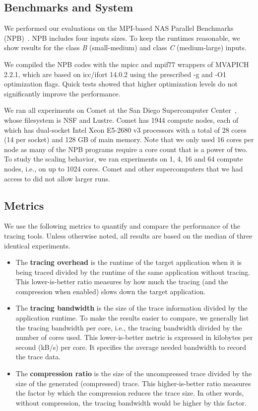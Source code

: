 \subsection{Benchmarks and System}

We performed our evaluations on the MPI-based NAS Parallel Benchmarks (NPB)~\cite{nas}.
%
NPB includes four inputs sizes.
%
To keep the runtimes reasonable, we show results for the class \textit{B} (small-medium) and class \textit{C} (medium-large) inputs.
%

We compiled the NPB codes with the mpicc and mpif77 wrappers of MVAPICH 2.2.1, which are based on icc/ifort 14.0.2 using the prescribed -g and -O1 optimization flags.
%
Quick tests showed that higher optimization levels do not significantly improve the performance.
%

We ran all experiments on Comet at the San Diego Supercomputer Center~\cite{comet}, whose filesystem is NSF and Lustre.
%
Comet has 1944 compute nodes, each of which has dual-socket Intel Xeon E5-2680 v3 processors with a total of 28 cores (14 per socket) and 128 GB of main memory.
%
Note that we only used 16 cores per node as many of the NPB programs require a core count that is a power of two.
%
To study the scaling behavior, we ran experiments on 1, 4, 16 and 64 compute nodes, i.e., on up to 1024 cores. Comet and other supercomputers that we had access to did not allow larger runs.

\subsection{Metrics}

We use the following metrics to quantify and compare the performance of the tracing tools.
%
Unless otherwise noted, all results are based on the median of three identical experiments.
%
\begin{itemize}
\item The \textbf{tracing overhead} is the runtime of the target application when it is being traced divided by the runtime of the same application without tracing.
%
This lower-is-better ratio measures by how much the tracing (and the compression when enabled) slows down the target application.
%
\item The \textbf{tracing bandwidth} is the size of the trace information divided by the application runtime.
%
To make the results easier to compare, we generally list the tracing bandwidth per core, i.e., the tracing bandwidth divided by the number of cores used.
%
This lower-is-better metric is expressed in kilobytes per second (kB/s) per core.
%
It specifies the average needed bandwidth to record the trace data.
%
\item The \textbf{compression ratio} is the size of the uncompressed trace divided by the size of the generated (compressed) trace.
%
This higher-is-better ratio measures the factor by which the compression reduces the trace size.
%
In other words, without compression, the tracing bandwidth would be higher by this factor.
\end{itemize}

